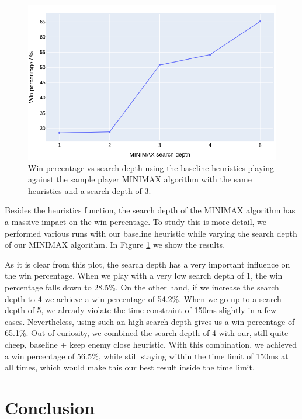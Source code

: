 \documentclass[aps,prd,notitlepage,floatfix,superscriptaddress,groupedaddress,nofootinbib]{revtex4-1}
\begin{document}
\begin{figure}[tbh!]
    \centering
    \includegraphics[width=0.8\linewidth]{plots/search_depth.png}
    \caption{Win percentage vs search depth using the baseline heuristics playing against the sample player MINIMAX algorithm with the same heuristics and a search depth of 3.}
    \label{fig:search_depth}
\end{figure}

Besides the heuristics function, the search depth of the MINIMAX algorithm has a massive impact on the win percentage. To study this is more detail, we performed various runs with our baseline heuristic while varying the search depth of our MINIMAX algorithm. In Figure \ref{fig:search_depth} we show the results.

As it is clear from this plot, the search depth has a very important influence on the win percentage. When we play with a very low search depth of 1, the win percentage falls down to 28.5\%. On the other hand, if we increase the search depth to 4 we achieve a win percentage of 54.2\%. When we go up to a search depth of 5, we already violate the time constraint of 150ms slightly in a few cases. Nevertheless, using such an high search depth gives us a win percentage of 65.1\%. Out of curiosity, we combined the search depth of 4 with our, still quite cheep, baseline + keep enemy close heuristic. With this combination, we achieved a win percentage of 56.5\%, while still staying within the time limit of 150ms at all times, which would make this our best result inside the time limit.

\section{Conclusion}
\end{document}
